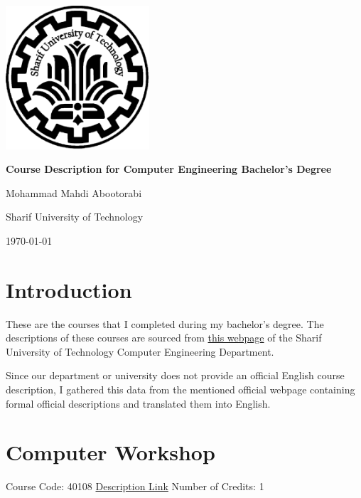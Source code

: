 \documentclass[
fontsize=11pt,
paper=a4,
parskip=half,
enlargefirstpage=off,    %
fromalign=right,        %
fromphone=on,           %
fromemail=on,
fromrule=off,           %
addrfield=off,          %
backaddress=on,         %
subject=beforeopening,  %
locfield=narrow,        %
foldmarks=off,          %
open=any
]{scrartcl}
\begin{document}
\begin{titlepage}
    \centering
    \vspace*{1cm}
    \includegraphics[width=0.4\textwidth]{sharif.png}\par\vspace{1cm}
    \vspace*{1.5cm}
    {\huge\bfseries Course Description for Computer Engineering Bachelor’s Degree\par}
    \vspace{3cm}
    {\Large Mohammad Mahdi Abootorabi\par}
    \vspace{1cm}
    {\Large Sharif University of Technology\par}
    \vspace{1cm} 
    {\Large \today\par}
    \vfill
\end{titlepage}

\newpage
\section*{Introduction}
These are the courses that I completed during my bachelor's degree. The descriptions of these courses are sourced from  \href{https://docs.ce.sharif.edu/course/}{this webpage} of the Sharif University of Technology Computer Engineering Department.

Since our department or university does not provide an official English course description, I gathered this data from the mentioned official webpage containing formal official descriptions and translated them into English.
\newpage
\tableofcontents
\newpage


\section{Computer Workshop}
Course Code: 40108 \qquad \quad \href{https://docs.ce.sharif.edu/course/40108}{Description Link}
\qquad \quad Number of Credits: 1
\end{document}

